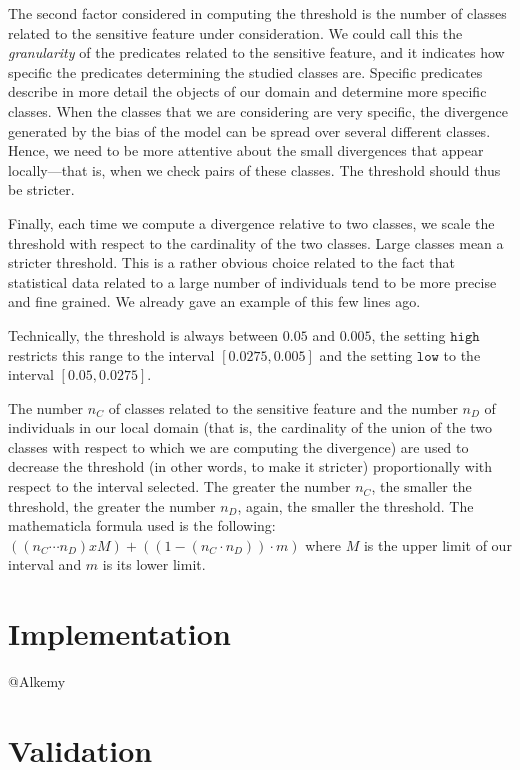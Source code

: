 \documentclass[
]{ceurart}
\begin{document}
The second factor considered in computing the threshold is the number of classes related to the sensitive feature under consideration. We could call this the {\it granularity} of the predicates related to the sensitive feature, and it indicates how specific the predicates determining the studied classes are. Specific predicates describe in more detail the objects of our domain and determine more specific classes. When the classes that we are considering are very specific, the divergence generated by the bias of the model can be spread over several different classes. Hence, we need to be more attentive about the small divergences that appear locally---that is, when we check pairs of these classes. The threshold should thus be stricter.


Finally, each time we compute a divergence relative to two classes, we scale the threshold with respect to the cardinality of the two classes. Large classes mean a stricter threshold. This is a rather obvious choice related to the fact that statistical data related to a large number of individuals tend to be more precise and fine grained. We already gave an example of this few lines ago.

Technically, the threshold is always between $0.05$ and $0.005$, the setting $\mathtt{high}$ restricts this range to the interval $[0.0275, 0.005]$ and the setting $\mathtt{low}$ to the interval $[0.05, 0.0275]$.


The number $n_C$ of classes related to the sensitive feature and the number $n_D$ of individuals in our local domain (that is, the cardinality of the union of the two classes with respect to which we are computing the divergence) are used to decrease the threshold (in other words, to make it stricter) proportionally with respect to the interval selected. The greater the number $n_C$, the smaller the threshold, the greater the number $n_D$, again, the smaller the threshold. The mathematicla formula used is the following:  $((n_C \cdots n_D) x M) + ((1-(n_C \cdot n_D)) \cdot m)$ where $M$ is the upper limit of our interval and $m$ is its lower limit.

\section{Implementation}

@Alkemy

\section{Validation}
\end{document}
